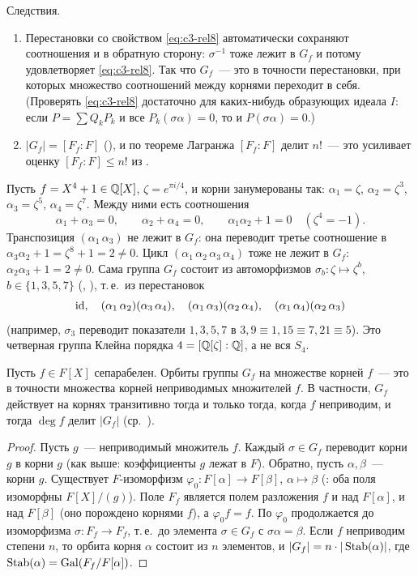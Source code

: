 Следствия.
\begin{enumerate}[label=(\alph*)]
\item Перестановки со свойством \eqref{eq:c3-rel8} автоматически сохраняют соотношения и в обратную сторону: $\sigma^{-1}$
тоже лежит в $G_f$ и потому удовлетворяет \eqref{eq:c3-rel8}. Так что $G_f$~--- это в точности перестановки, при
которых множество соотношений между корнями переходит в себя. (Проверять \eqref{eq:c3-rel8} достаточно для
каких-нибудь образующих идеала $I$: если $P=\sum Q_kP_k$ и все $P_k(\sigma\alpha)=0$, то и $P(\sigma\alpha)=0$.)
\item $|G_f|=[F_f:F]$ (), и по теореме Лагранжа $[F_f:F]$ делит $n!$~--- это усиливает оценку
$[F_f:F]\le n!$ из .
\end{enumerate}

\begin{example}[3.27c]
Пусть $f=X^4+1\in\mathbb Q[X]$, $\zeta=e^{\pi i/4}$, и корни занумерованы так: $\alpha_1=\zeta$, $\alpha_2=\zeta^3$, $\alpha_3=\zeta^5$,
$\alpha_4=\zeta^7$. Между ними есть соотношения
\[
\alpha_1+\alpha_3=0,\qquad\alpha_2+\alpha_4=0,\qquad\alpha_1\alpha_2+1=0\quad(\zeta^4=-1).
\]
Транспозиция $(\alpha_1\,\alpha_3)$ не лежит в $G_f$: она переводит третье соотношение в $\alpha_3\alpha_2+1=\zeta^8+1=2\ne0$.
Цикл $(\alpha_1\,\alpha_2\,\alpha_3\,\alpha_4)$ тоже не лежит в $G_f$: $\alpha_2\alpha_3+1=2\ne0$. Сама группа $G_f$ состоит из
автоморфизмов $\sigma_b\colon\zeta\mapsto\zeta^b$, $b\in\{1,3,5,7\}$ (, ), т.\,е.\ из перестановок
\[
\operatorname{id},\quad(\alpha_1\,\alpha_2)(\alpha_3\,\alpha_4),\quad(\alpha_1\,\alpha_3)(\alpha_2\,\alpha_4),\quad(\alpha_1\,\alpha_4)(\alpha_2\,\alpha_3)
\]
(например, $\sigma_3$ переводит показатели $1,3,5,7$ в $3,9\equiv1,15\equiv7,21\equiv5$). Это четверная группа Клейна
порядка $4=[\mathbb Q[\zeta]:\mathbb Q]$, а не вся $S_4$.
\end{example}

\begin{proposition}[3.27d]
Пусть $f\in F[X]$ сепарабелен. Орбиты группы $G_f$ на множестве корней $f$~--- это в точности множества корней
неприводимых множителей $f$. В частности, $G_f$ действует на корнях транзитивно тогда и только тогда, когда $f$
неприводим, и тогда $\deg f$ делит $|G_f|$ \textup(ср.\ \textup).
\end{proposition}

\begin{proof}
Пусть $g$~--- неприводимый множитель $f$. Каждый $\sigma\in G_f$ переводит корни $g$ в корни $g$ (как выше: коэффициенты
$g$ лежат в $F$). Обратно, пусть $\alpha,\beta$~--- корни $g$. Существует $F$-изоморфизм $\varphi_0\colon F[\alpha]\to F[\beta]$,
$\alpha\mapsto\beta$ (: оба поля изоморфны $F[X]/(g)$). Поле $F_f$ является полем разложения $f$ и над $F[\alpha]$, и
над $F[\beta]$ (оно порождено корнями $f$), а $\varphi_0f=f$. По  $\varphi_0$ продолжается до изоморфизма
$\sigma\colon F_f\to F_f$, т.\,е.\ до элемента $\sigma\in G_f$ с $\sigma\alpha=\beta$. Если $f$ неприводим степени $n$, то
орбита корня $\alpha$ состоит из $n$ элементов, и $|G_f|=n\cdot|\operatorname{Stab}(\alpha)|$, где $\operatorname{Stab}(\alpha)=\operatorname{Gal}(F_f/F[\alpha])$.
\end{proof}

